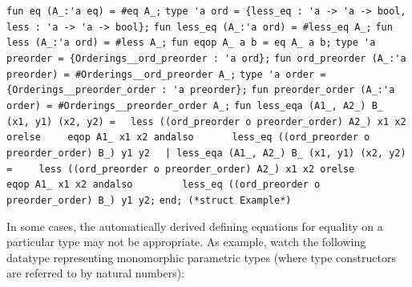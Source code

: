 \begin{isabellebody}
\begin{isamarkuptext}
\verb|fun eq (A_:'a eq) = #eq A_;|\newline%
\newline%
\verb|type 'a ord = {less_eq : 'a -> 'a -> bool, less : 'a -> 'a -> bool};|\newline%
\verb|fun less_eq (A_:'a ord) = #less_eq A_;|\newline%
\verb|fun less (A_:'a ord) = #less A_;|\newline%
\newline%
\verb|fun eqop A_ a b = eq A_ a b;|\newline%
\newline%
\verb|type 'a preorder = {Orderings__ord_preorder : 'a ord};|\newline%
\verb|fun ord_preorder (A_:'a preorder) = #Orderings__ord_preorder A_;|\newline%
\newline%
\verb|type 'a order = {Orderings__preorder_order : 'a preorder};|\newline%
\verb|fun preorder_order (A_:'a order) = #Orderings__preorder_order A_;|\newline%
\newline%
\verb|fun less_eqa (A1_, A2_) B_ (x1, y1) (x2, y2) =|\newline%
\verb|  less ((ord_preorder o preorder_order) A2_) x1 x2 orelse|\newline%
\verb|    eqop A1_ x1 x2 andalso|\newline%
\verb|      less_eq ((ord_preorder o preorder_order) B_) y1 y2|\newline%
\verb|  |\verb,|,\verb| less_eqa (A1_, A2_) B_ (x1, y1) (x2, y2) =|\newline%
\verb|    less ((ord_preorder o preorder_order) A2_) x1 x2 orelse|\newline%
\verb|      eqop A1_ x1 x2 andalso|\newline%
\verb|        less_eq ((ord_preorder o preorder_order) B_) y1 y2;|\newline%
\newline%
\verb|end; (*struct Example*)|%
\end{isamarkuptext}%
\isamarkuptrue%
%
\endisatagquote
{\isafoldquote}%
%
\isadelimquote
%
\endisadelimquote
%
\begin{isamarkuptext}%
In some cases, the automatically derived defining equations
  for equality on a particular type may not be appropriate.
  As example, watch the following datatype representing
  monomorphic parametric types (where type constructors
  are referred to by natural numbers):%

\end{isamarkuptext}
\end{isabellebody}
